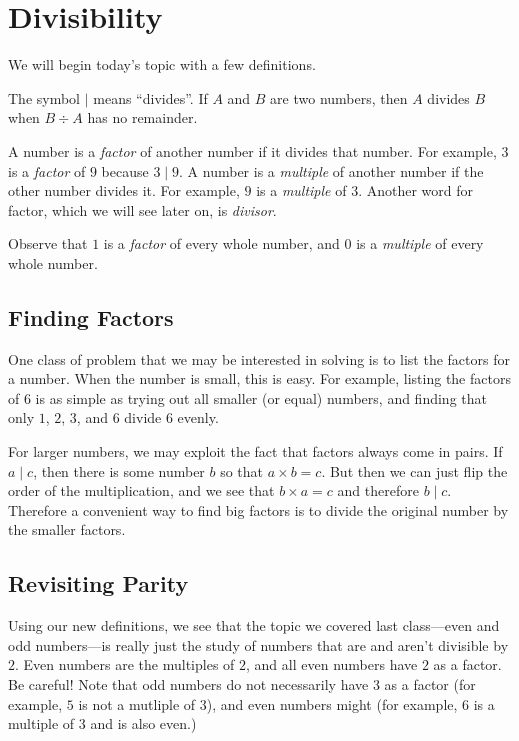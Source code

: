\documentclass[a4paper,10pt]{report}
\begin{document}
\section{Divisibility}

We will begin today's topic with a few definitions.

The symbol $\mid$ means ``divides''. If $A$ and $B$ are two numbers, then $A$
divides $B$ when $B \div A$ has no remainder.

A number is a \emph{factor} of another number if it divides that number. For
example, $3$ is a \emph{factor} of $9$ because $3 \mid 9$. A number is a
\emph{multiple} of another number if the other number divides it. For example,
$9$ is a \emph{multiple} of $3$. Another word for factor, which we will see
later on, is \emph{divisor}.

Observe that $1$ is a \emph{factor} of every whole number, and $0$ is a
\emph{multiple} of every whole number.

\subsection{Finding Factors}

One class of problem that we may be interested in solving is to list the factors
for a number. When the number is small, this is easy. For example, listing the
factors of $6$ is as simple as trying out all smaller (or equal) numbers, and
finding that only $1$, $2$, $3$, and $6$ divide $6$ evenly.

For larger numbers, we may exploit the fact that factors always come in pairs.
If $a \mid c$, then there is some number $b$ so that $a \times b = c$. But then
we can just flip the order of the multiplication, and we see that $b \times a =
c$ and therefore $b \mid c$. Therefore a convenient way to find big factors is
to divide the original number by the smaller factors.

\subsection{Revisiting Parity}

Using our new definitions, we see that the topic we covered last class---even
and odd numbers---is really just the study of numbers that are and aren't
divisible by $2$. Even numbers are the multiples of $2$, and all even numbers
have $2$ as a factor. Be careful! Note that odd numbers do not necessarily have
$3$ as a factor (for example, $5$ is not a mutliple of $3$), and even numbers
might (for example, $6$ is a multiple of $3$ and is also even.)
\end{document}
